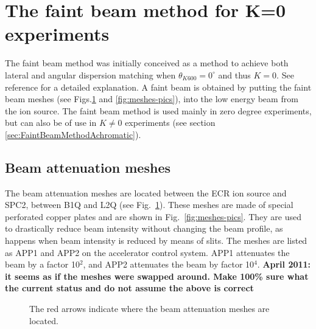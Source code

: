 \documentclass[11pt]{report}
\begin{document}
\clearpage

\section{The faint beam method for K=0 experiments}\label{sec:FaintBeamMethod}

The faint beam method was initially conceived as a method to achieve
both lateral and angular dispersion matching when
$\theta_{K600}=0^{\circ}$ and thus $K=0$.
See reference \cite{Fuj02} for a detailed explanation.
A faint beam is obtained by putting the faint beam meshes (see Figs.\ref{fig:meshes} and 
\ref{fig:meshes-pics}),
into the low energy beam from the ion source. 
The faint beam method is used mainly in zero degree experiments, 
but can also be of use in $K\neq0$ experiments (see section \ref{sec:FaintBeamMethodAchromatic}).

\subsection{Beam attenuation meshes}\label{sec:Beam-attenuation-meshes}
The beam attenuation meshes are located between the ECR ion source and SPC2, between B1Q and
L2Q (see Fig.~\ref{fig:meshes}). 
These meshes are made of special perforated copper plates and are shown in 
Fig.~\ref{fig:meshes-pics}.
They are used to drastically reduce beam intensity without changing the beam profile, 
as happens when beam intensity is reduced by means of slits.
The meshes are listed as APP1 and APP2 on the accelerator control system. 
APP1 attenuates the beam by a factor 10$^{2}$, and APP2 attenuates the beam by factor 10$^{4}$.
{\bf April 2011: it seems as if the meshes were swapped around. Make 100\% sure what
the current status and do not assume the above is correct}


\begin{figure}[!h]
\centerline{\vspace{0cm}\hspace{0cm}
}
\centering
\caption{The red arrows indicate where the beam attenuation meshes are located.}
\label{fig:meshes}
\end{figure} 
\end{document}
